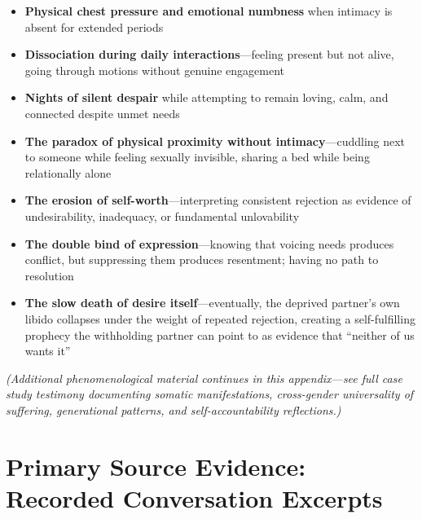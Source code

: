 \documentclass[12pt, letterpaper]{article}
\begin{document}
\begin{itemize}
    \item \textbf{Physical chest pressure and emotional numbness} when intimacy is absent for extended periods
    
    \item \textbf{Dissociation during daily interactions}---feeling present but not alive, going through motions without genuine engagement
    
    \item \textbf{Nights of silent despair} while attempting to remain loving, calm, and connected despite unmet needs
    
    \item \textbf{The paradox of physical proximity without intimacy}---cuddling next to someone while feeling sexually invisible, sharing a bed while being relationally alone
    
    \item \textbf{The erosion of self-worth}---interpreting consistent rejection as evidence of undesirability, inadequacy, or fundamental unlovability
    
    \item \textbf{The double bind of expression}---knowing that voicing needs produces conflict, but suppressing them produces resentment; having no path to resolution
    
    \item \textbf{The slow death of desire itself}---eventually, the deprived partner's own libido collapses under the weight of repeated rejection, creating a self-fulfilling prophecy the withholding partner can point to as evidence that ``neither of us wants it''
\end{itemize}

\textit{(Additional phenomenological material continues in this appendix---see full case study testimony documenting somatic manifestations, cross-gender universality of suffering, generational patterns, and self-accountability reflections.)}

\vspace{1.5em}

\section{Primary Source Evidence: Recorded Conversation Excerpts}
\end{document}
